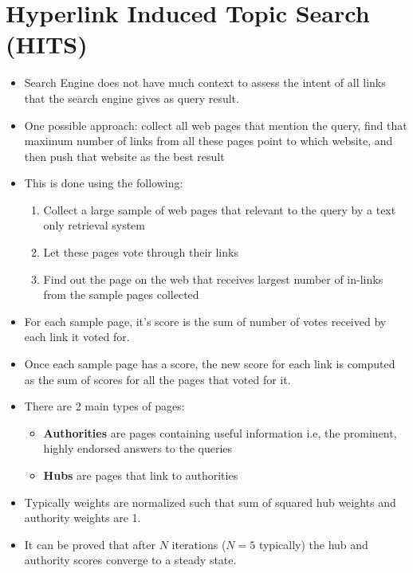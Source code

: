 \documentclass{article}
\begin{document}
\section{Hyperlink Induced Topic Search (HITS)}
\begin{itemize}
    \item Search Engine does not have much context to assess the intent of all links that the search engine gives as query result. 
    
    \item One possible approach: collect all web pages that mention the query, find that maximum number of links from all these pages point to which website, and then push that website as the best result
    
    \item This is done using the following:
    \begin{enumerate}
        \item Collect a large sample of web pages that relevant to the query by a text only retrieval system
        
        \item  Let these pages vote through their links
        
        \item Find out the page on the web that receives largest number of in-links from the sample pages collected
    \end{enumerate}
    
    \item For each sample page, it's score is the sum of number of votes received by each link it voted for. 
    
    \item Once each sample page has a score, the new score for each link is computed as the sum of scores for all the pages that voted for it.
    
    \item There are 2 main types of pages:
    \begin{itemize}
        \item \textbf{Authorities} are pages containing useful information i.e, the prominent, highly endorsed answers to the queries
        
        \item \textbf{Hubs} are pages that link to authorities 
    \end{itemize}
    
    \item Typically weights are normalized such that sum of squared hub weights and authority weights are 1. 
    
    \item It can be proved that after $N$ iterations ($N=5$ typically) the hub and authority scores converge to a steady state. 
\end{itemize}
\end{document}
